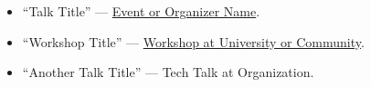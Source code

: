 \begin{itemize}
  \item ``Talk Title'' --- \href{https://example.com/event-1}{Event or Organizer Name}.
  \item ``Workshop Title'' --- \href{https://example.com/event-2}{Workshop at University or Community}.
  \item ``Another Talk Title'' --- Tech Talk at Organization.
\end{itemize}

